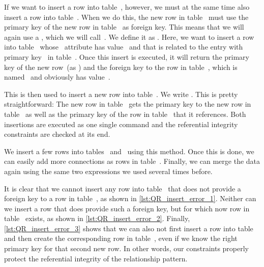 If we want to insert a row into table~, however, we must at the same time also insert a row into table~.
When we do this, the new row in table~ must use the primary key of the new row in table~ as foreign key.
This means that we will again use a , which we will call~.
We define it as .
Here, we want to insert a row into table~ whose ~attribute has value~ and that is related to the entry with primary key~ in table~.
Once this insert is executed, it will return the primary key of the new row~(as ) and the foreign key to the row in table~, which is named~ and obviously has value~.%
%
\begin{sloppypar}%
This  is then used to insert a new row into table~.
We write .
This is pretty straightforward:
The new row in table~ gets the primary key to the new row in table~ as well as the primary key of the row in table~ that it references.
Both insertions are executed as one single command and the referential integrity constraints are checked at its end.%
\end{sloppypar}%
%
We insert a few rows into tables~ and~ using this method.
Once this is done, we can easily add more connections as rows in table~.
Finally, we can merge the data again using the same two  expressions we used several times before.

It is clear that we cannot insert any row into table~ that does not provide a foreign key to a row in table~, as shown in \cref{lst:QR_insert_error_1}.
Neither can we insert a row that does provide such a foreign key, but for which now row in table~ exists, as shown in \cref{lst:QR_insert_error_2}.
Finally, \cref{lst:QR_insert_error_3} shows that we can also not first insert a row into table~ and then create the corresponding row in table~, even if we know the right primary key for that second new row.
In other words, our constraints properly protect the referential integrity of the relationship pattern.%
%
\FloatBarrier%
\endhsection%
%
